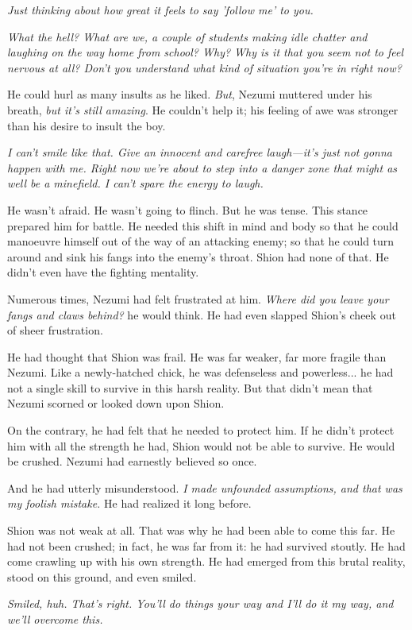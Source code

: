 \emph{Just thinking about how great it feels to say 'follow me' to you.}

\emph{What the hell? What are we, a couple of students making idle chatter and
laughing on the way home from school? Why? Why is it that you seem not
to feel nervous at all? Don't you understand what kind of situation
you're in right now?}

He could hurl as many insults as he liked. \emph{But}, Nezumi muttered under
his breath, \emph{but it's still amazing}. He couldn't help it; his feeling of
awe was stronger than his desire to insult the boy.

\emph{I can't smile like that. Give an innocent and carefree laugh---it's just
not gonna happen with me. Right now we're about to step into a danger
zone that might as well be a minefield. I can't spare the energy to
laugh.}

He wasn't afraid. He wasn't going to flinch. But he was tense. This
stance prepared him for battle. He needed this shift in mind and body so
that he could manoeuvre himself out of the way of an attacking enemy; so
that he could turn around and sink his fangs into the enemy's throat.
Shion had none of that. He didn't even have the fighting mentality.

Numerous times, Nezumi had felt frustrated at him. \emph{Where did you leave
your fangs and claws behind?} he would think. He had even slapped Shion's
cheek out of sheer frustration.

He had thought that Shion was frail. He was far weaker, far more fragile
than Nezumi. Like a newly-hatched chick, he was defenseless and
powerless... he had not a single skill to survive in this harsh reality.
But that didn't mean that Nezumi scorned or looked down upon Shion.

On the contrary, he had felt that he needed to protect him. If he didn't
protect him with all the strength he had, Shion would not be able to
survive. He would be crushed. Nezumi had earnestly believed so once.

And he had utterly misunderstood. \emph{I made unfounded assumptions, and that
was my foolish mistake.} He had realized it long before.

Shion was not weak at all. That was why he had been able to come this
far. He had not been crushed; in fact, he was far from it: he had
survived stoutly. He had come crawling up with his own strength. He had
emerged from this brutal reality, stood on this ground, and even smiled.

\emph{Smiled, huh. That's right. You'll do things your way and I'll do it my
way, and we'll overcome this.}

